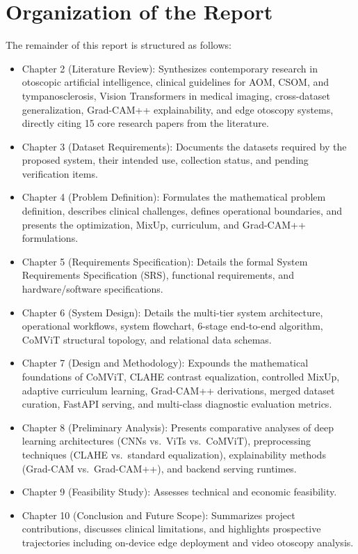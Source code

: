 \documentclass[12pt,a4paper]{report}
\renewcommand{\textbf}[1]{#1}
\begin{document}
\section{Organization of the Report}
The remainder of this report is structured as follows:
\begin{itemize}
    \item \textbf{Chapter 2 (Literature Review):} Synthesizes contemporary research in otoscopic artificial intelligence, clinical guidelines for AOM, CSOM, and tympanosclerosis, Vision Transformers in medical imaging, cross-dataset generalization, Grad-CAM++ explainability, and edge otoscopy systems, directly citing 15 core research papers from the literature.
    \item \textbf{Chapter 3 (Dataset Requirements):} Documents the datasets required by the proposed system, their intended use, collection status, and pending verification items.
    \item \textbf{Chapter 4 (Problem Definition):} Formulates the mathematical problem definition, describes clinical challenges, defines operational boundaries, and presents the optimization, MixUp, curriculum, and Grad-CAM++ formulations.
    \item \textbf{Chapter 5 (Requirements Specification):} Details the formal System Requirements Specification (SRS), functional requirements, and hardware/software specifications.
    \item \textbf{Chapter 6 (System Design):} Details the multi-tier system architecture, operational workflows, system flowchart, 6-stage end-to-end algorithm, CoMViT structural topology, and relational data schemas.
    \item \textbf{Chapter 7 (Design and Methodology):} Expounds the mathematical foundations of CoMViT, CLAHE contrast equalization, controlled MixUp, adaptive curriculum learning, Grad-CAM++ derivations, merged dataset curation, FastAPI serving, and multi-class diagnostic evaluation metrics.
    \item \textbf{Chapter 8 (Preliminary Analysis):} Presents comparative analyses of deep learning architectures (CNNs vs.\ ViTs vs.\ CoMViT), preprocessing techniques (CLAHE vs.\ standard equalization), explainability methods (Grad-CAM vs.\ Grad-CAM++), and backend serving runtimes.
    \item \textbf{Chapter 9 (Feasibility Study):} Assesses technical and economic feasibility.
    \item \textbf{Chapter 10 (Conclusion and Future Scope):} Summarizes project contributions, discusses clinical limitations, and highlights prospective trajectories including on-device edge deployment and video otoscopy analysis.
\end{itemize}
\fi
\end{document}
